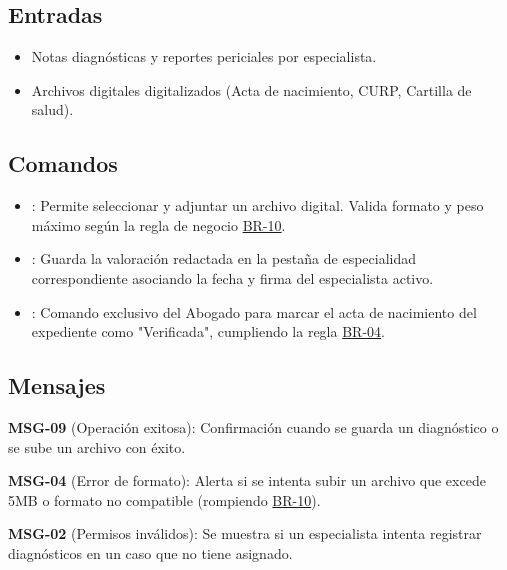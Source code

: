 \subsection{Entradas}
	\begin{itemize}
		\item Notas diagnósticas y reportes periciales por especialista.
		\item Archivos digitales digitalizados (Acta de nacimiento, CURP, Cartilla de salud).
	\end{itemize}

\subsection{Comandos}
	\begin{itemize}
		\item {}: Permite seleccionar y adjuntar un archivo digital. Valida formato y peso máximo según la regla de negocio \hyperlink{BR-10}{BR-10}.
		\item {}: Guarda la valoración redactada en la pestaña de especialidad correspondiente asociando la fecha y firma del especialista activo.
		\item {}: Comando exclusivo del Abogado para marcar el acta de nacimiento del expediente como "Verificada", cumpliendo la regla \hyperlink{BR-04}{BR-04}.
	\end{itemize}

\subsection{Mensajes}
	\begin{Citemize}
		\item {\bf MSG-09} (Operación exitosa): Confirmación cuando se guarda un diagnóstico o se sube un archivo con éxito.
		\item {\bf MSG-04} (Error de formato): Alerta si se intenta subir un archivo que excede 5MB o formato no compatible (rompiendo \hyperlink{BR-10}{BR-10}).
		\item {\bf MSG-02} (Permisos inválidos): Se muestra si un especialista intenta registrar diagnósticos en un caso que no tiene asignado.
	\end{Citemize}
